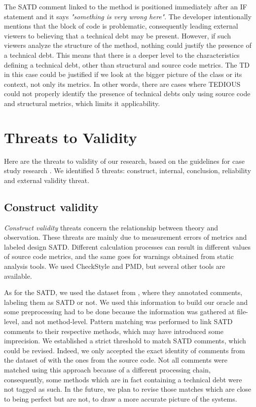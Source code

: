 The SATD comment linked to the method is positioned immediately after an \textsc{IF} statement and it says \textit{"something is very wrong here"}. The developer intentionally mentions that the block of code is problematic, consequently leading external viewers to believing that a technical debt may be present. However, if such viewers analyze the structure of the method, nothing could justify the presence of a technical debt. This means that there is a deeper level to the characteristics defining a technical debt, other than structural and source code metrics. The TD in this case could be justified if we look at the bigger picture of the class or its context, not only its metrics. In other words, there are cases where TEDIOUS could not properly identify the presence of technical debts only using source code and structural metrics, which limits it applicability.

\section{Threats to Validity}

Here are the threats to validity of our research, based on the guidelines for case study research \citep{yin2013case}. We identified 5 threats: construct, internal, conclusion, reliability and external validity threat.

\subsection{Construct validity}


\textit{Construct validity} threats concern the relationship between theory and observation. These threats are mainly due to measurement errors of metrics and labeled design SATD. Different calculation processes can result in different values of source code metrics, and the same goes for warnings obtained from static analysis tools. We used CheckStyle and PMD, but several other tools are available. 

As for the SATD, we used the dataset from \citet{maldonado17}, where they annotated comments, labeling them as SATD or not. We used this information to build our oracle and some preprocessing had to be done because the information was gathered at file-level, and not method-level. Pattern matching was performed to link SATD comments to their respective methods, which may have introduced some imprecision. We established a strict threshold to match SATD comments, which could be revised. Indeed, we only accepted the exact identity of comments from the dataset of \citet{maldonado17} with the ones from the source code. Not all comments were matched using this approach because of a different processing chain, consequently, some methods which are in fact containing a technical debt were not tagged as such. In the future, we plan to revise those matches which are close to being perfect but are not, to draw a more accurate picture of the systems. 

